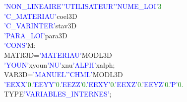 \textcolor{blue}{'NON\_LINEAIRE'}\hspace*{1em}\textcolor{blue}{'UTILISATEUR'}\hspace*{1em}\textcolor{blue}{'NUME\_LOI'}\hspace*{1em}\textcolor{green}{3}\\
\textcolor{blue}{'C\_MATERIAU'}\hspace*{1em}coel3D\\
\textcolor{blue}{'C\_VARINTER'}\hspace*{1em}stav3D\\
\textcolor{blue}{'PARA\_LOI'}\hspace*{1em}\hspace*{1em}\hspace*{1em}para3D\\
\textcolor{blue}{'CONS'}\hspace*{1em}M;\\
\newline
MATR3D\hspace*{1em}=\hspace*{1em}\textcolor{blue}{'MATERIAU'}\hspace*{1em}MODL3D\\
\textcolor{blue}{'YOUN'}\hspace*{1em}xyoun\hspace*{1em}\textcolor{blue}{'NU'}\hspace*{1em}xnu\hspace*{1em}\textcolor{blue}{'ALPH'}\hspace*{1em}xalph;\\
\newline
VAR3D\hspace*{1em}=\hspace*{1em}\textcolor{blue}{'MANUEL'}\hspace*{1em}\textcolor{blue}{'CHML'}\hspace*{1em}MODL3D\\
\textcolor{blue}{'EEXX'}\hspace*{1em}\textcolor{green}{0.}\hspace*{1em}\textcolor{blue}{'EEYY'}\hspace*{1em}\textcolor{green}{0.}\hspace*{1em}\textcolor{blue}{'EEZZ'}\hspace*{1em}\textcolor{green}{0.}\hspace*{1em}\textcolor{blue}{'EEXY'}\hspace*{1em}\textcolor{green}{0.}\hspace*{1em}\textcolor{blue}{'EEXZ'}\hspace*{1em}\textcolor{green}{0.}\hspace*{1em}\textcolor{blue}{'EEYZ'}\hspace*{1em}\textcolor{green}{0.}\hspace*{1em}\textcolor{blue}{'P'}\hspace*{1em}\textcolor{green}{0.}\\
TYPE\hspace*{1em}\textcolor{blue}{'VARIABLES\_INTERNES'};